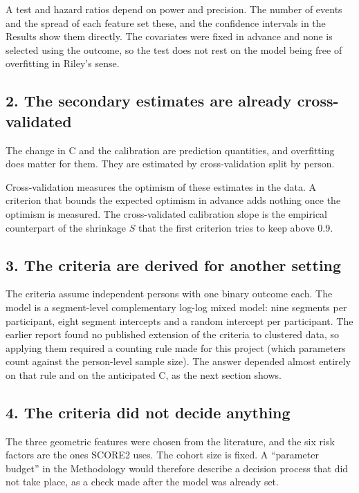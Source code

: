 \documentclass[11pt]{article}
\begin{document}
\begin{mine}
A test and hazard ratios depend on power and precision.
The number of events and the spread of each feature set these, and the confidence intervals in the
Results show them directly.
The covariates were fixed in advance and none is selected using the outcome, so the test does not
rest on the model being free of overfitting in Riley's sense.
\end{mine}

\subsection*{2. The secondary estimates are already cross-validated}

The change in C and the calibration are prediction quantities, and overfitting does matter for them.
They are estimated by cross-validation split by person.

\begin{mine}
Cross-validation measures the optimism of these estimates in the data.
A criterion that bounds the expected optimism in advance adds nothing once the optimism is measured.
The cross-validated calibration slope is the empirical counterpart of the shrinkage $S$ that the
first criterion tries to keep above 0.9.
\end{mine}

\subsection*{3. The criteria are derived for another setting}

The criteria assume independent persons with one binary outcome each.
The model is a segment-level complementary log-log mixed model: nine segments per participant, eight
segment intercepts and a random intercept per participant.
The earlier report found no published extension of the criteria to clustered data, so applying them
required a counting rule made for this project (which parameters count against the person-level
sample size).
The answer depended almost entirely on that rule and on the anticipated C, as the next section shows.

\subsection*{4. The criteria did not decide anything}

The three geometric features were chosen from the literature, and the six risk factors are the ones
SCORE2 uses.
The cohort size is fixed.
A ``parameter budget'' in the Methodology would therefore describe a decision process that did not
take place, as a check made after the model was already set.
\end{document}

